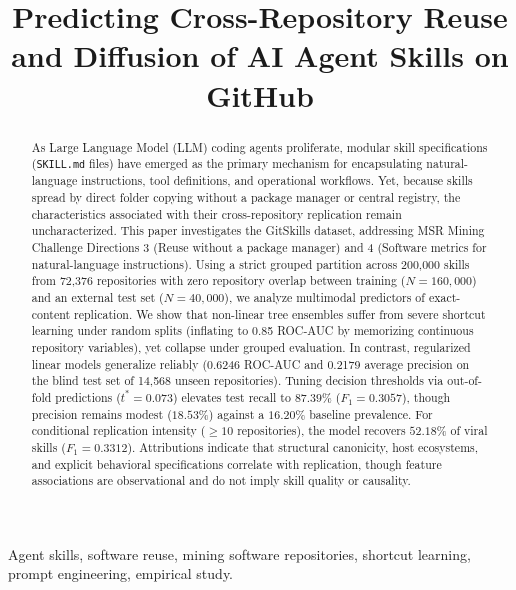 \documentclass[10pt,conference]{IEEEtran}
\begin{document}
\title{Predicting Cross-Repository Reuse and Diffusion of AI Agent Skills on GitHub}

\author{
}

\maketitle

\begin{abstract}
As Large Language Model (LLM) coding agents proliferate, modular skill specifications (\texttt{SKILL.md} files) have emerged as the primary mechanism for encapsulating natural-language instructions, tool definitions, and operational workflows. Yet, because skills spread by direct folder copying without a package manager or central registry, the characteristics associated with their cross-repository replication remain uncharacterized. This paper investigates the GitSkills dataset, addressing MSR Mining Challenge Directions 3 (Reuse without a package manager) and 4 (Software metrics for natural-language instructions). Using a strict grouped partition across 200,000 skills from 72,376 repositories with zero repository overlap between training ($N=160,000$) and an external test set ($N=40,000$), we analyze multimodal predictors of exact-content replication. We show that non-linear tree ensembles suffer from severe shortcut learning under random splits (inflating to 0.85 ROC-AUC by memorizing continuous repository variables), yet collapse under grouped evaluation. In contrast, regularized linear models generalize reliably (0.6246 ROC-AUC and 0.2179 average precision on the blind test set of 14,568 unseen repositories). Tuning decision thresholds via out-of-fold predictions ($t^* = 0.073$) elevates test recall to $87.39\%$ ($F_1 = 0.3057$), though precision remains modest ($18.53\%$) against a $16.20\%$ baseline prevalence. For conditional replication intensity ($\ge 10$ repositories), the model recovers $52.18\%$ of viral skills ($F_1 = 0.3312$). Attributions indicate that structural canonicity, host ecosystems, and explicit behavioral specifications correlate with replication, though feature associations are observational and do not imply skill quality or causality.
\end{abstract}

\begin{IEEEkeywords}
Agent skills, software reuse, mining software repositories, shortcut learning, prompt engineering, empirical study.
\end{IEEEkeywords}
\end{document}
